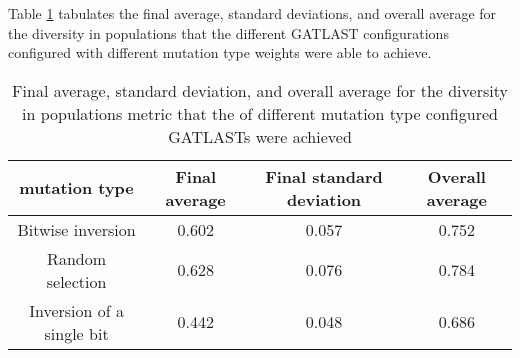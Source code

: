 Table \ref{tab:HP:GA:mutationType:diversity in populations} tabulates the final average, standard deviations, and overall average for the diversity in populations that the different GATLAST configurations configured with different mutation type weights were able to achieve.
\begin{table}[tbh!]
\centering
\begin{adjustbox}{trim=0cm 0cm 0cm 0cm, clip=true}
\begin{tabular}{|c|c|c|c|}
\hline
mutation type & Final average & Final standard deviation & Overall average\\
\hline
Bitwise inversion & 0.602 & 0.057 & 0.752\\\hline
Random selection & 0.628 & 0.076 & 0.784\\\hline
Inversion of a single bit & 0.442 & 0.048 & 0.686\\\hline
\end{tabular}
\end{adjustbox}
\caption{Final average, standard deviation, and overall average for the diversity in populations metric that the of different mutation type configured GATLASTs were achieved}
\label{tab:HP:GA:mutationType:diversity in populations}
\end{table}